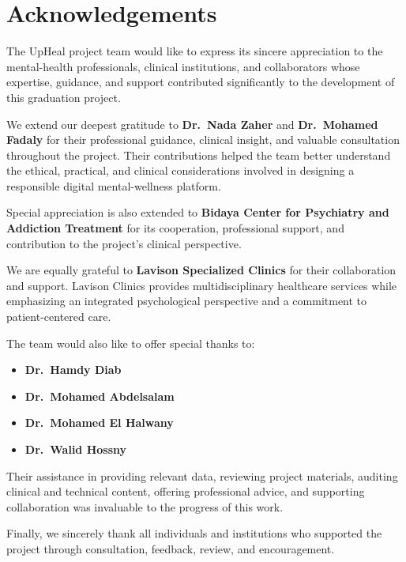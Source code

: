 \documentclass[12pt,a4paper,oneside,openany]{report}
\begin{document}
\newpage
\chapter*{Acknowledgements}

The UpHeal project team would like to express its sincere appreciation to the mental-health professionals, clinical institutions, and collaborators whose expertise, guidance, and support contributed significantly to the development of this graduation project.

We extend our deepest gratitude to \textbf{Dr.\ Nada Zaher} and \textbf{Dr.\ Mohamed Fadaly} for their professional guidance, clinical insight, and valuable consultation throughout the project. Their contributions helped the team better understand the ethical, practical, and clinical considerations involved in designing a responsible digital mental-wellness platform.

Special appreciation is also extended to \textbf{Bidaya Center for Psychiatry and Addiction Treatment} for its cooperation, professional support, and contribution to the project's clinical perspective.

We are equally grateful to \textbf{Lavison Specialized Clinics} for their collaboration and support. Lavison Clinics provides multidisciplinary healthcare services while emphasizing an integrated psychological perspective and a commitment to patient-centered care.

The team would also like to offer special thanks to:
\begin{itemize}[nosep]
\item \textbf{Dr.\ Hamdy Diab}
\item \textbf{Dr.\ Mohamed Abdelsalam}
\item \textbf{Dr.\ Mohamed El Halwany}
\item \textbf{Dr.\ Walid Hossny}
\end{itemize}

Their assistance in providing relevant data, reviewing project materials, auditing clinical and technical content, offering professional advice, and supporting collaboration was invaluable to the progress of this work.

Finally, we sincerely thank all individuals and institutions who supported the project through consultation, feedback, review, and encouragement.
\end{document}
